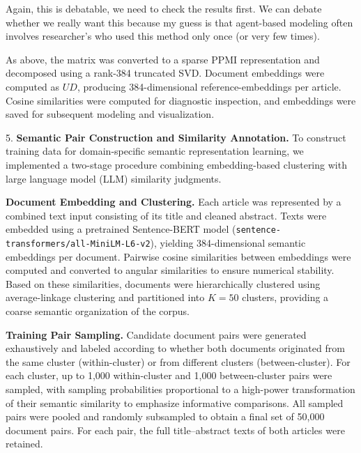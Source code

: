 \documentclass[pdflatex,sn-mathphys-num]{sn-jnl}%
\theoremstyle{thmstyleone}%
\theoremstyle{thmstyletwo}%
\theoremstyle{thmstylethree}%
\begin{document}
\vspace{1em}

Again, this is debatable, we need to check the results first. We can debate whether we really want this because my guess is that agent-based modeling often involves researcher's who used this method only once (or very few times).
\vspace{1em}

As above, the matrix was converted to a sparse PPMI representation and decomposed using a rank-384 truncated SVD. Document embeddings were computed as $U D$, producing 384-dimensional reference-embeddings per article. Cosine similarities were computed for diagnostic inspection, and embeddings were saved for subsequent modeling and visualization.

\vspace{1em}

{\Large 5.} \textbf{Semantic Pair Construction and Similarity Annotation.}
To construct training data for domain-specific semantic representation learning, we implemented a two-stage procedure combining embedding-based clustering with large language model (LLM) similarity judgments.

\vspace{0.70em}

\textbf{Document Embedding and Clustering.} Each article was represented by a combined text input consisting of its title and cleaned abstract. Texts were embedded using a pretrained Sentence-BERT model (\texttt{sentence-transformers/all-MiniLM-L6-v2}), yielding 384-dimensional semantic embeddings per document. Pairwise cosine similarities between embeddings were computed and converted to angular similarities to ensure numerical stability. Based on these similarities, documents were hierarchically clustered using average-linkage clustering and partitioned into $K=50$ clusters, providing a coarse semantic organization of the corpus.

\vspace{0.75em}

\textbf{Training Pair Sampling.}
Candidate document pairs were generated exhaustively and labeled according to whether both documents originated from the same cluster (within-cluster) or from different clusters (between-cluster). For each cluster, up to 1,000 within-cluster and 1,000 between-cluster pairs were sampled, with sampling probabilities proportional to a high-power transformation of their semantic similarity to emphasize informative comparisons. All sampled pairs were pooled and randomly subsampled to obtain a final set of 50,000 document pairs. For each pair, the full title--abstract texts of both articles were retained.
\end{document}
